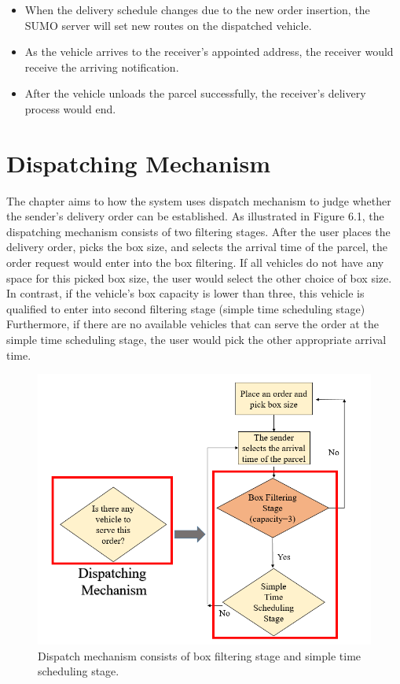 \documentclass[12pt]{ksthesis}
\begin{document}
\begin{thesis}
{\begin{itemize}
\item
When the delivery schedule changes due to the new order insertion, the SUMO server will set new routes on the dispatched vehicle.

\item
As the vehicle arrives to the receiver’s appointed address, the receiver would receive the arriving notification.

\item
After the vehicle unloads the parcel successfully, the receiver’s delivery process would end.

\end{itemize}


\chapter{Dispatching Mechanism}\label{Chap:Dispatching Mechanism}
The chapter aims to how the system uses dispatch mechanism to judge whether the sender’s delivery order can be established.
As illustrated in Figure 6.1, the dispatching mechanism consists of two filtering stages. After the user places the delivery order, picks the box size, and selects the arrival time of the parcel, the order request would enter into the box filtering.
If all vehicles do not have any space for this picked box size, the user would select the other choice of box size. In contrast, if the vehicle’s box capacity is lower than three, this vehicle is qualified to enter into second filtering stage (simple time scheduling stage) 
Furthermore, if there are no available vehicles that can serve the order at the simple time scheduling stage, the user would pick the other appropriate arrival time.

\begin{figure}[H]
\centering
\includegraphics[width=1.0\textwidth]{./Thesis_figures/F6-1_dispatching_mechanism.PNG}
\caption{\large Dispatch mechanism consists of box filtering stage and simple time scheduling stage.}
\vspace{0.5cm}
\label{Fig:Dispatch_mechanism}
\end{figure}

}
\end{thesis}
\end{document}
